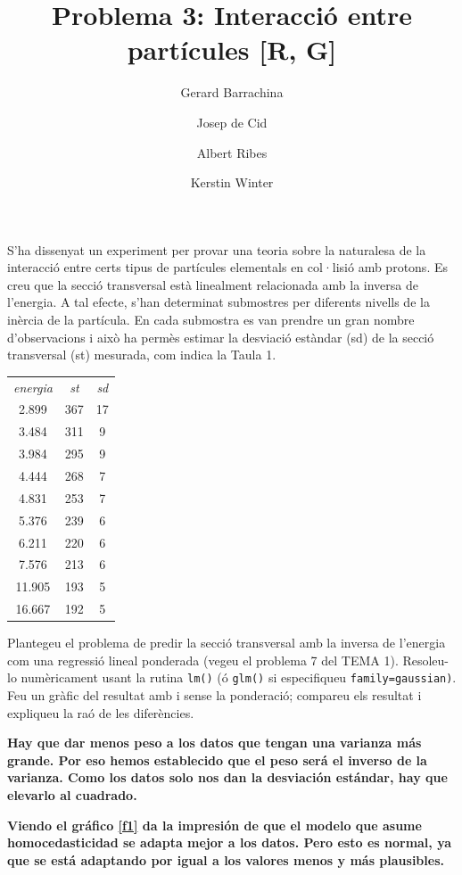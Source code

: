 \documentclass[a4paper]{article}
\author{
Gerard Barrachina
\and
Josep de Cid
\and
Albert Ribes
\and
Kerstin Winter
}
\title{Problema 3: Interacció entre partícules [R, G]}
\begin{document}
\maketitle

S'ha dissenyat un experiment per provar una teoria sobre la naturalesa de la interacció entre certs tipus
de partícules elementals en col·lisió amb protons. Es creu que la secció transversal està linealment
relacionada amb la inversa de l'energia. A tal efecte, s'han determinat submostres per diferents nivells
de la inèrcia de la partícula. En cada submostra es van prendre un gran nombre d'observacions i això ha
permès estimar la desviació estàndar (sd) de la secció transversal (st) mesurada, com indica la Taula 1.

\begin{center}
\begin{tabular}{c c c}

  \textit{energia} & \textit{st} & \textit{sd} \\
  2.899 & 367 & 17 \\
  3.484 & 311 & 9 \\
  3.984 & 295 & 9 \\
  4.444 & 268 & 7 \\
  4.831 & 253 & 7 \\
  5.376 & 239 & 6 \\
  6.211 & 220 & 6 \\
  7.576 & 213 & 6 \\
  11.905 & 193 & 5 \\
  16.667 & 192 & 5 \\
\end{tabular}
\end{center}

Plantegeu el problema de predir la secció transversal amb la inversa de l'energia com una regressió
lineal ponderada (vegeu el problema 7 del TEMA 1). Resoleu-lo numèricament usant la rutina \texttt{lm()} (ó
\texttt{glm()} si especifiqueu \texttt{family=gaussian)}. Feu un gràfic del resultat amb i sense la ponderació; compareu
els resultat i expliqueu la raó de les diferències.

\hspace{5cm}

\textbf{
Hay que dar menos peso a los datos que tengan una varianza más grande. Por eso
hemos establecido que el peso será el inverso de la varianza. Como los datos
solo nos dan la desviación estándar, hay que elevarlo al cuadrado.
}

\textbf{Viendo el gráfico \ref{f1} da la impresión de que el modelo que asume
homocedasticidad se adapta mejor a los datos. Pero esto es normal, ya que se
está adaptando por igual a los valores menos y más plausibles.}
\end{document}
